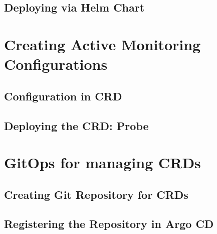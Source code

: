 \subsection{Deploying via Helm Chart}

\section{Creating Active Monitoring Configurations}

\subsection{Configuration in CRD}

\subsection{Deploying the CRD: Probe}

\section{GitOps for managing CRDs}

\subsection{Creating Git Repository for CRDs}

\subsection{Registering the Repository in Argo CD}
